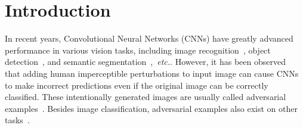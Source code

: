 \documentclass[letterpaper]{article} %
\def\etc{\emph{etc.}}
\begin{document}
\section{Introduction} \label{sec:intro}
In recent years, Convolutional Neural Networks (CNNs) have greatly advanced performance in various vision tasks, including image recognition~\cite{he2016identity,krizhevsky2012imagenet,simonyan2015very}, object detection~\cite{Ren_2015_Faster,Girshick_2015_Fast}, and semantic segmentation~\cite{Chen_2016_DeepLab},~\etc. However, it has been observed~\cite{szegedy2013intriguing,goodfellow2014explaining} that adding human imperceptible perturbations to input image can cause CNNs to make incorrect predictions even if the original image can be correctly classified. These intentionally generated images are usually called adversarial examples~\cite{goodfellow2014explaining,kurakin2016adversarial,szegedy2013intriguing}. Besides image classification, adversarial examples also exist on other tasks~\cite{xie2017adversarial,bai2019adversarial,sun2019node,tang2019robust,li2019volumetric}.

\end{document}
